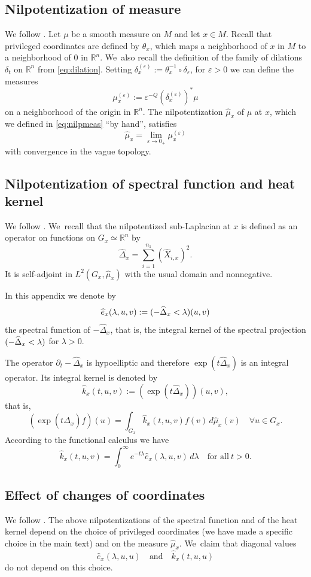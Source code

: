 \documentclass[11pt]{article}
\theoremstyle{definition}
\let\epsilon\varepsilon
\newcommand{\1}{\mathbbm{1}}
\newcommand{\R}{\mathbb{R}}
\numberwithin{equation}{section}
\begin{document}
\subsection{Nilpotentization of measure}
We follow \cite[\S A.5.6]{CHT1}. Let $\mu$ be a smooth measure on $M$ and let $x \in M$. Recall that privileged coordinates are defined by $\theta_x$, which maps a neighborhood of $x$ in $M$ to a neighborhood of $0$ in $\R^n$. We~also recall the definition of the family of dilations $\delta_t$ on $\R^n$ from \eqref{eq:dilation}. Setting $\delta_x^{(\epsilon)} := \theta_x^{-1} \circ \delta_\varepsilon$, for $\varepsilon>0$ we can define the measures
\[
\mu_x^{(\varepsilon)} := \varepsilon^{-Q}(\delta_x^{(\varepsilon)})^*\mu
\]
on a neighborhood of the origin in $\R^n$. The nilpotentization $\widehat\mu_x$ of $\mu$ at $x$, which we defined in \eqref{eq:nilpmeas} ``by hand'', satisfies
\[
\widehat{\mu}_x=\lim_{\varepsilon\to 0_+}\mu_x^{(\epsilon)}
\]
with convergence in the vague topology.

\subsection{Nilpotentization of spectral function and heat kernel}
We follow \cite[\S A.8.3]{CHT1}. We~recall that the nilpotentized sub-Laplacian at $x$ is defined as an operator on functions on $G_x\simeq \R^n$ by
\[
\widehat{\Delta}_x= \sum_{i=1}^{n_1} (\widehat{X}_{i,x})^2.
\]
It is self-adjoint in $L^2(G_x,\widehat\mu_x)$ with the usual domain and nonnegative.

In this appendix we denote by
\[
\widehat e_x(\lambda,u,v) := \1(-\widehat\Delta_x <\lambda)(u,v)
\]
the spectral function of $-\widehat\Delta_x$, that is, the integral kernel of the spectral projection $\1(-\widehat\Delta_x<\lambda)$ for $\lambda>0$.

The operator $\partial_t- \widehat{\Delta}_x$ is hypoelliptic and therefore $\exp (t \widehat \Delta_x)$ is an integral operator. Its integral kernel is denoted by
\[
\widehat k_x(t,u,v) := (\exp(t\widehat\Delta_x))(u,v),
\]
that is,
\[
(\exp(t \widehat \Delta_x) f)(u)= \int_{G_x} \widehat k_x(t,u,v) f(v)\,d \widehat{\mu}_x(v)
\quad \forall u\in G_x.
\]
According to the functional calculus we have
\begin{equation}
\label{eq:heatkernelspecfcn}
\widehat k_x(t,u,v) = \int_0^\infty e^{-t\lambda} \widehat e_x(\lambda,u,v)\,d\lambda
\quad\text{for all}\ t>0.
\end{equation}

\subsection{Effect of changes of coordinates}
We follow \cite[2nd part of App.\,A.8.2]{CHT1}. The above nilpotentizations of the spectral function and of the heat kernel depend on the choice of privileged coordinates (we have made a specific choice in the main text) and on the measure $\widehat\mu_x$. We~claim that diagonal values
\[
\widehat e_x(\lambda,u,u)
\quad\text{and}\quad
\widehat k_x(t,u,u)
\]
do not depend on this choice.
\end{document}
